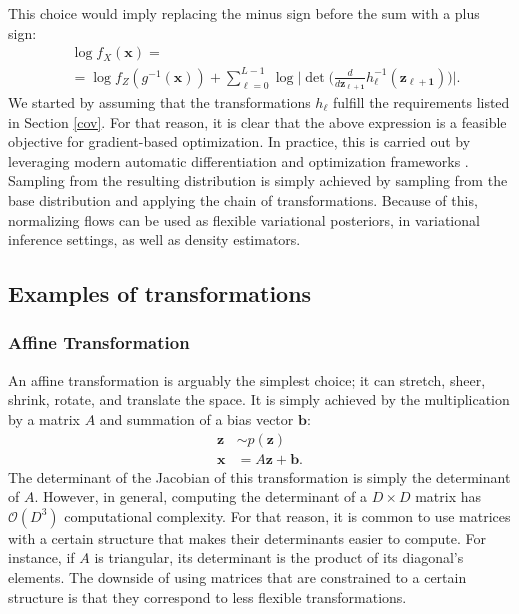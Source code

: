 This choice would imply replacing the minus sign before the sum with a plus sign:
\begin{align}
    &\log f_X(\bm{x}) = \nonumber \\
    &= \log f_Z(g^{-1}(\bm{x})) + \sum_{\ell=0}^{L-1} \log \Big|\det\Big(\frac{d}{d\bm{z_{\ell+1}}}h_{\ell}^{-1}(\bm{z_{\ell+1}})\Big) \Big|.
\end{align}
We started by assuming that the transformations $h_\ell$ fulfill the requirements
listed in Section \ref{cov}. For that reason, it is clear that the above expression
is a feasible objective for gradient-based optimization. In practice, this is carried
out by leveraging modern automatic differentiation and optimization frameworks \autocites{flowpp, Glow, real-nvp}.
Sampling from the resulting distribution is simply achieved by sampling from the base
distribution and applying the chain of transformations. Because of this, normalizing
flows can be used as flexible variational posteriors, in variational
inference settings, as well as density estimators.

\subsection{Examples of transformations}
\subsubsection{Affine Transformation}
An affine transformation is arguably the simplest choice; it can
stretch, sheer, shrink, rotate, and translate the space. It is simply achieved
by the multiplication by a matrix $A$ and summation of a bias vector $\bm{b}$:
\begin{align}
    \bm{z} &\sim p(\bm{z}) \\
    \bm{x} &= A\bm{z} + \bm{b}.
\end{align}
The determinant of the Jacobian of this transformation is simply the determinant
of $A$. However, in general, computing the determinant of a $D \times D$
matrix has $\mathcal{O}(D^3)$ computational complexity. For that reason, it is
common to use matrices with a certain structure that makes their determinants
easier to compute. For instance, if $A$ is triangular, its determinant is
the product of its diagonal's elements. The downside of using matrices that are
constrained to a certain structure is that they correspond to less flexible transformations.

